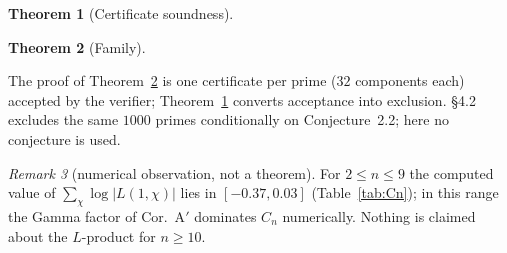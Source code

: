 \documentclass[11pt]{amsart}
\newtheorem{theorem}{Theorem}[section]
\theoremstyle{remark}\newtheorem{remark}[theorem]{Remark}
\theoremstyle{definition}\newtheorem{definition}[theorem]{Definition}
\theoremstyle{definition}\newtheorem{algorithm}[theorem]{Algorithm}
\providecommand{\proofsdir}{../../proofs} %
\begin{document}
\begin{theorem}[Certificate soundness]\label{thm:cert}

\end{theorem}
\begin{theorem}[Family]\label{thm:family}

\end{theorem}
The proof of Theorem~\ref{thm:family} is one certificate per prime ($32$ components each) accepted by the verifier; Theorem~\ref{thm:cert} converts acceptance into exclusion. \cite{KY} \S4.2 excludes the same $1000$ primes conditionally on Conjecture~2.2; here no conjecture is used.

\begin{remark}[numerical observation, not a theorem]\label{rem:Lprod}
For $2\le n\le9$ the computed value of $\sum_\chi\log|L(1,\chi)|$ lies in $[-0.37,0.03]$ (Table~\ref{tab:Cn}); in this range the Gamma factor of Cor.~A$'$ dominates $C_n$ numerically. Nothing is claimed about the $L$-product for $n\ge10$.
\end{remark}
\end{document}
